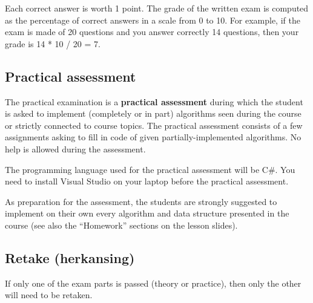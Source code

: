 	\noindent
	Each correct answer is worth 1 point. The grade of the written exam is computed as the percentage of correct answers in a scale from 0 to 10. For example, if the exam is made of 20 questions and you answer correctly 14 questions, then your grade is 14 * 10 / 20 = 7.

	\subsection{Practical assessment}
	The practical examination is a \textbf{practical assessment} during which the student is asked to implement (completely or in part) algorithms seen during the course or strictly connected to course topics. The practical assessment consists of a few assignments asking to fill in code of given partially-implemented algorithms. No help is allowed during the assessment.
	
	The programming language used for the practical assessment will be C\#. You need to install Visual Studio on your laptop before the practical assessment.
	
	As preparation for the assessment, the students are strongly suggested to implement on their own every algorithm and data structure presented in the course (see also the ``Homework'' sections on the lesson slides).

	
	\subsection{Retake (herkansing)}
	If only one of the exam parts is passed (theory or practice), then only the other will need to be retaken.